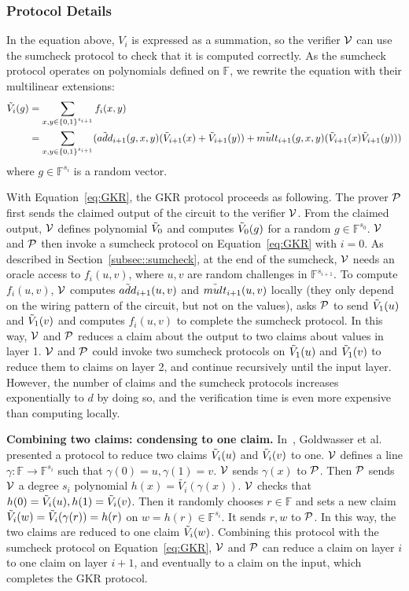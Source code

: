 


\subsubsection{Protocol Details}\label{sec::gkr}

In the equation above, $V_i$ is expressed as a summation, so the verifier $\V$ can use the sumcheck protocol to check that it is computed correctly. As the sumcheck protocol operates on polynomials defined on $\mathbb{F}$, we rewrite the equation with their multilinear extensions:
\begin{align}\label{eq:GKR}
\tV_i(g)&=\sum_{x, y \in\binary^{s_{i+1}}}f_i(x,y)\nonumber\\
&=\sum_{x, y \in\binary^{s_{i+1}}}(\tadd_{i+1}(g,x,y)(\tV_{i+1}(x)+\tV_{i+1}(y))+\tmult_{i+1}(g,x,y)(\tV_{i+1}(x)\tV_{i+1}(y)))
\end{align}
where $g\in\mathbb{F}^{s_i}$ is a random vector. 

With Equation~\ref{eq:GKR}, the GKR protocol proceeds as following. The prover $\P$ first sends the claimed output of the circuit to the verifier $\V$. From the claimed output, $\V$ defines polynomial $\tV_0$ and computes $\tV_0(g)$ for a random $g\in\mathbb{F}^{s_0}$. $\V$ and $\P$ then invoke a sumcheck protocol on Equation~\ref{eq:GKR} with $i=0$. As described in Section~\ref{subsec::sumcheck}, at the end of the sumcheck, $\V$ needs an oracle access to $f_i(u,v)$, where $u,v$ are random challenges in $\mathbb{F}^{s_{i+1}}$. To compute $f_i(u,v)$, $\V$ computes $\tadd_{i+1}(u,v)$ and $\tmult_{i+1}(u,v)$ locally (they only depend on the wiring pattern of the circuit, but not on the values), asks $\P$ to send $\tV_1(u)$ and $\tV_1(v)$ and computes $f_i(u,v)$ to complete the sumcheck protocol. In this way, $\V$ and $\P$ reduces a claim about the output to two claims about values in layer 1. $\V$ and $\P$ could invoke two sumcheck protocols on $\tV_1(u)$ and $\tV_1(v)$ to reduce them to claims on layer 2, and continue recursively until the input layer. However, the number of claims and the sumcheck protocols increases exponentially to $d$ by doing so, and the verification time is even more expensive than computing locally. 

\smallskip\noindent\textbf{Combining two claims: condensing to one claim.} In~\cite{GKR}, Goldwasser et al. presented a protocol to reduce two claims $\tV_i(u)$ and $\tV_i(v)$ to one. $\V$ defines a line $\gamma: \mathbb{F} \rightarrow \mathbb{F}^{s_i}$ such that $\gamma(0)=u, \gamma(1)=v$. $\V$ sends $\gamma(x)$ to $\P$. Then $\P$ sends $\V$ a degree $s_i$ polynomial $h(x)=\tilde{V_i}(\gamma(x))$. $\V$ checks that $h(0)=\tV_i(u), h(1)=\tV_i(v)$. Then it randomly chooses $r\in\mathbb{F}$ and sets a new claim $\tV_i(w) = \tV_i(\gamma(r)) = h(r)$ on $w=h(r) \in \mathbb{F}^{s_i}$. It sends $r, w$ to $\P$. In this way, the two claims are reduced to one claim $\tV_i(w)$. Combining this protocol with the sumcheck protocol on Equation~\ref{eq:GKR}, $\V$ and $\P$ can reduce a claim on layer $i$ to one claim on layer $i+1$, and eventually to a claim on the input, which completes the GKR protocol.

